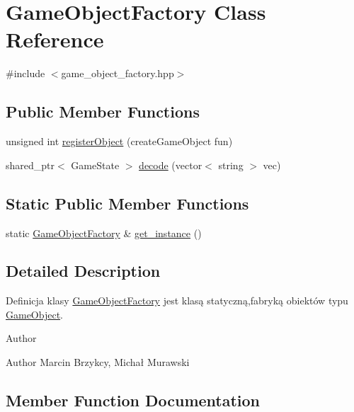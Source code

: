 \hypertarget{classGameObjectFactory}{}\section{Game\+Object\+Factory Class Reference}
\label{classGameObjectFactory}


{\ttfamily \#include $<$game\+\_\+object\+\_\+factory.\+hpp$>$}

\subsection*{Public Member Functions}
\begin{DoxyCompactItemize}
\item 
unsigned int \hyperlink{classGameObjectFactory_adf030f7a094987d46ea1f99f304bb8d9}{register\+Object} (create\+Game\+Object fun)
\item 
shared\+\_\+ptr$<$ Game\+State $>$ \hyperlink{classGameObjectFactory_ad155104354369275fd9698e9747d0f21}{decode} (vector$<$ string $>$ vec)
\end{DoxyCompactItemize}
\subsection*{Static Public Member Functions}
\begin{DoxyCompactItemize}
\item 
static \hyperlink{classGameObjectFactory}{Game\+Object\+Factory} \& \hyperlink{classGameObjectFactory_a0922b66b572b855b8924377020095263}{get\+\_\+instance} ()
\end{DoxyCompactItemize}


\subsection{Detailed Description}
Definicja klasy \hyperlink{classGameObjectFactory}{Game\+Object\+Factory} jest klasą statyczną,fabryką obiektów typu \hyperlink{classGameObject}{Game\+Object}. \begin{DoxyAuthor}{Author}

\end{DoxyAuthor}
\begin{DoxyParagraph}{Author}
Marcin Brzykcy, Michał Murawski 
\end{DoxyParagraph}


\subsection{Member Function Documentation}
